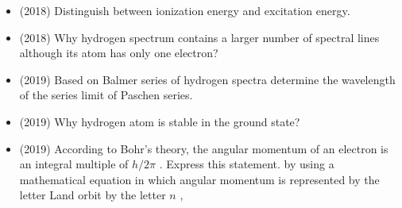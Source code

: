 \documentclass{article}
\begin{document}
\begin{itemize}
\item (2018)  Distinguish between ionization energy and excitation energy.
\item (2018)  Why hydrogen spectrum contains a larger number of spectral lines although its  atom has only one electron? 
\item (2019)  Based on Balmer series of hydrogen spectra determine the wavelength of the series limit of Paschen series. 
\item (2019)  Why hydrogen atom is stable in the ground state? 
\item (2019)  According to Bohr’s theory, the angular momentum of an electron is an integral multiple of $ h/2\pi$ .  Express this statement. by using a mathematical equation in which angular momentum is represented by the letter Land orbit by the letter $ n$ , 
\end{itemize}
\end{document}
